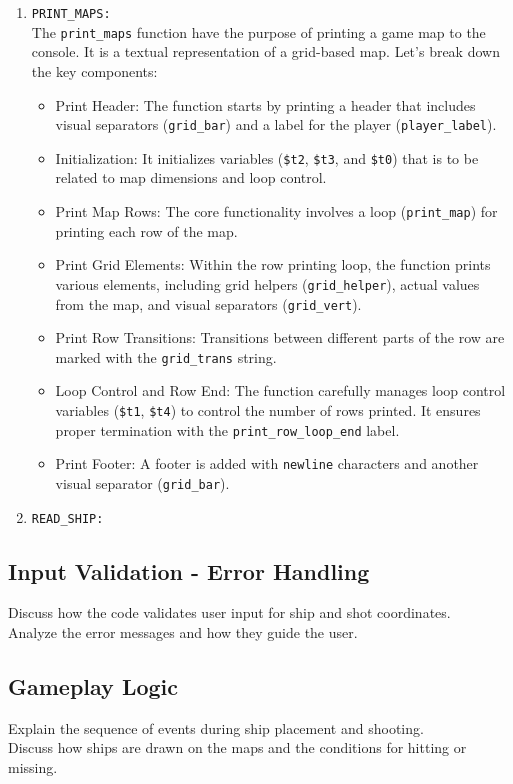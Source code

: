\begin{enumerate}
    \item \large{\texttt{PRINT\_MAPS:}} \\[6pt]
    The \texttt{print\_maps} function have the purpose of printing a game map to the console. It is a textual representation of a grid-based map. Let's break down the key components:

    \begin{itemize}
        \item Print Header: The function starts by printing a header that includes visual separators (\texttt{grid\_bar}) and a label for the player (\texttt{player\_label}).
        \item Initialization: It initializes variables (\texttt{\$t2}, \texttt{\$t3}, and \texttt{\$t0}) that is to be related to map dimensions and loop control.
        \item Print Map Rows: The core functionality involves a loop (\texttt{print\_map}) for printing each row of the map.
        \item Print Grid Elements: Within the row printing loop, the function prints various elements, including grid helpers (\texttt{grid\_helper}), actual values from the map, and visual separators (\texttt{grid\_vert}).
        \item Print Row Transitions: Transitions between different parts of the row are marked with the \texttt{grid\_trans} string.
        \item Loop Control and Row End: The function carefully manages loop control variables (\texttt{\$t1}, \texttt{\$t4}) to control the number of rows printed. It ensures proper termination with the \texttt{print\_row\_loop\_end} label.
        \item Print Footer: A footer is added with \texttt{newline} characters and another visual separator (\texttt{grid\_bar}). \\
    \end{itemize}

    \item \large{\texttt{READ\_SHIP:}} \\[6pt]

\end{enumerate}

\subsection{Input Validation - Error Handling}
Discuss how the code validates user input for ship and shot coordinates. \\

Analyze the error messages and how they guide the user.

\subsection{Gameplay Logic}
Explain the sequence of events during ship placement and shooting.\\

Discuss how ships are drawn on the maps and the conditions for hitting or missing.
